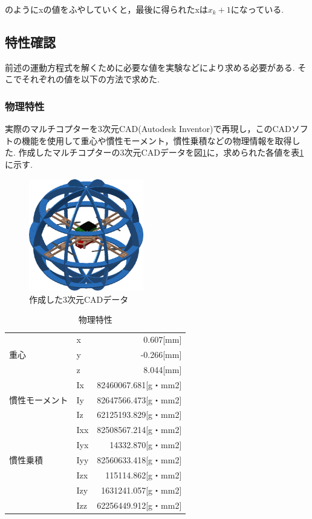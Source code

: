 \documentclass[12pt,oneside]{sotsuken_paper}
\begin{document}
のようにxの値をふやしていくと，最後に得られたxは\(x_k+1\)になっている.\cite{runge} 

\subsection{特性確認}
前述の運動方程式を解くために必要な値を実験などにより求める必要がある.
そこでそれぞれの値を以下の方法で求めた.

\subsubsection{物理特性}
実際のマルチコプターを3次元CAD(Autodesk Inventor)で再現し，このCADソフトの機能を使用して重心や慣性モーメント，慣性乗積などの物理情報を取得した.
作成したマルチコプターの3次元CADデータを図\ref{fig:3DCAD}に，求められた各値を表\ref{table:phy}に示す.

\begin{figure}[htbp]
	\begin{center}
		\includegraphics[width=50mm]{image/3DCAD.jpg}
		\caption{作成した3次元CADデータ}
		\label{fig:3DCAD}
	\end{center}
\end{figure}

\begin{table}[htbp]
	\begin{center}
		\caption{物理特性}
		\begin{tabular}{|l|l|r|} \hline
			 & x & 0.607[mm]\\
			重心 & y & -0.266[mm]\\
			 & z & 8.044[mm]\\\hline
			　& Ix & 82460067.681[g・mm2]\\
			慣性モーメント & Iy & 82647566.473[g・mm2]\\
			 & Iz & 62125193.829[g・mm2]\\\hline
			 & Ixx & 82508567.214[g・mm2]\\
			 & Iyx & 14332.870[g・mm2]\\
			慣性乗積 & Iyy & 82560633.418[g・mm2]\\
			 & Izx & 115114.862[g・mm2]\\
			 & Izy & 1631241.057[g・mm2]\\
			 & Izz & 62256449.912[g・mm2]\\\hline
		\end{tabular}
		\label{table:phy}
	\end{center}
\end{table}
\end{document}
